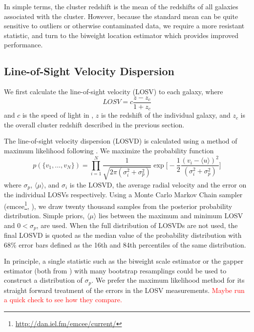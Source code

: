 \documentclass[apj, revtex4]{emulateapj}
\newcommand{\editorial}[1]{\textcolor{red}{#1}}
\begin{document}
In simple terms, the cluster redshift is the mean of the redshifts of all galaxies associated with the cluster. However, because the standard mean can be quite sensitive to outliers or otherwise contaminated data, we require a more resistant statistic, and turn to the biweight location estimator \citep{Beers1990} which provides improved performance. 

\subsection{Line-of-Sight Velocity Dispersion}\label{sec: LOSVD}
We first calculate the line-of-sight velocity (LOSV) to each galaxy, where
\begin{equation}
	LOSV = c\frac{z - z_c}{1+z_c}
\end{equation}
and $c$ is the speed of light in \kms, $z$ is the redshift of the individual galaxy, and $z_c$ is the overall cluster redshift described in the previous section.

The line-of-sight velocity dispersion (LOSVD) is calculated using a method of maximum likelihood following \cite{Walker2006}. We maximize the probability function 
\begin{equation}
  \label{eq: jointGaussian}
p(\{v_1, ..., v_N\})=\displaystyle\prod_{i=1}^{N}\frac{1}{\sqrt{2\pi(\sigma_i^2+\sigma_p^2)}}\exp\biggl[-\frac{1}{2}\frac{(v_i-\langle u \rangle)^2}{(\sigma_i^2+\sigma_p^2)}\biggr]
\end{equation}
where $\sigma_p$, $\langle\mu\rangle$, and $\sigma_i$ is the LOSVD, the average radial velocity and the error on the individual LOSVs respectively. Using a Monte Carlo Markov Chain sampler ({\sc emcee}\footnote{\url{http://dan.iel.fm/emcee/current/}}, \citealt{Foreman-Mackey2013}), we draw twenty thousand samples from the posterior probability distribution. Simple priors, $\langle\mu\rangle$ lies between the maximum and minimum LOSV and $0< \sigma_p$, are used. When the full distribution of LOSVDs are not used, the final LOSVD is quoted as the median value of the probability distribution with 68\% error bars defined as the 16th and 84th percentiles of the same distribution.

In principle, a single statistic such as the biweight scale estimator or the gapper estimator (both from \citealt{Beers1990}) with many bootstrap resamplings could be used to construct a distribution of $\sigma_p$. We prefer the maximum likelihood method for its straight forward treatment of the errors in the LOSV measurements. \editorial{Maybe run a quick check to see how they compare.}
\end{document}
